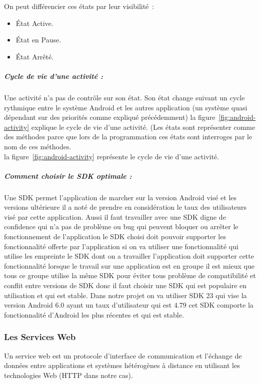 On peut différencier ces états par leur visibilité :
\begin{itemize}
    \item État Active.
    \item État en Pause.
    \item État Arrêté.
\end{itemize}

\subparagraph{Cycle de vie d'une activité :}

Une activité n'a pas de contrôle sur son état. Son état change suivant un
cycle rythmique entre le système Android et les autres application (un système
quasi dépendant sur des priorités comme expliqué précédemment) la
figure~\ref{fig:android-activity} explique le cycle de vie d'une activité. (Les
états sont représenter comme des méthodes parce que lors de la programmation
ces états sont interroges par le nom de ces méthodes.\\ la
figure~\ref{fig:android-activity} représente le cycle de vie d'une activité.


\clearpage

\subparagraph{Comment choisir le SDK optimale :}

Une SDK permet l'application de marcher sur la version Android visé et les
versions ultérieure il a noté de prendre en considération le taux des
utilisateurs visé par cette application. Aussi il faut travailler avec une SDK
digne de confidence qui n'a pas de problème ou bug qui peuvent bloquer ou
arrêter le fonctionnement de l'application le SDK choisi doit pouvoir supporter
les fonctionnalité offerte par l'application si on va utiliser une
fonctionnalité qui utilise les empreinte le SDK dont on a travailler
l'application doit supporter cette fonctionnalité lorsque le travail sur une
application est en groupe il est mieux que tous ce groupe utilise la même SDK
pour éviter tous problème de compatibilité et conflit entre versions de SDK
donc il faut choisir une SDK qui est populaire en utilisation et qui est
stable. Dans notre projet on va utiliser SDK 23 qui vise la version Android 6.0
ayant un taux d'utilisateur qui est 4.79 %
cet SDK comporte la fonctionnalité d'Android les plus récentes et qui est
stable.

\subsubsection{Les Services Web}

Un service web est un protocole d'interface de communication et l'échange de
données entre applications et systèmes hétérogènes à distance en utilisant les
technologies Web (HTTP dans notre cas).


